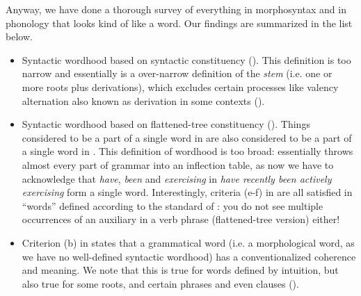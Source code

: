 \documentclass[a4paper, oneside, scheme=plain, 12pt]{article}
\newcommand*{\citepage}[1]{p.~{#1}}
\newcommand*{\citepages}[1]{pp.~{#1}}
\newcommand*{\term}[1]{\emph{#1}}
\newcommand{\form}[1]{\emph{#1}}
\begin{document}
Anyway, we have done a thorough survey of everything in morphosyntax and in phonology that looks kind of like a word. 
Our findings are summarized in the list below.

\begin{itemize}
    \item Syntactic wordhood based on syntactic constituency ().
    This definition is too narrow and essentially is a over-narrow definition of the \term{stem}
    (i.e. one or more roots plus derivations),
    which excludes certain processes like valency alternation also known as derivation in some contexts
    ().

    \item Syntactic wordhood based on flattened-tree constituency ().
    Things considered to be a part of a single word in 
    are also considered to be a part of a single word in .
    This definition of wordhood is too broad:
    essentially throws almost every part of grammar into an inflection table,
    as now we have to acknowledge that \form{have}, \form{been} and \form{exercising} in \form{have recently been actively exercising} form a single word.
    Interestingly, criteria (e-f) in \citet[\citepages{15-16}]{dixon2010basic2} are all satisfied in ``words'' defined according to the standard of :
    you do not see multiple occurrences of an auxiliary in a verb phrase (flattened-tree version) either!

    \item Criterion (b) in \citet[\citepage{13}]{dixon2010basic2} states that a grammatical word  (i.e. a morphological word, as we have no well-defined syntactic wordhood)
    has a conventionalized coherence and meaning.
    We note that this is true for words defined by intuition,
    but also true for some roots, and certain phrases and even clauses
    ().


\end{itemize}
\end{document}
